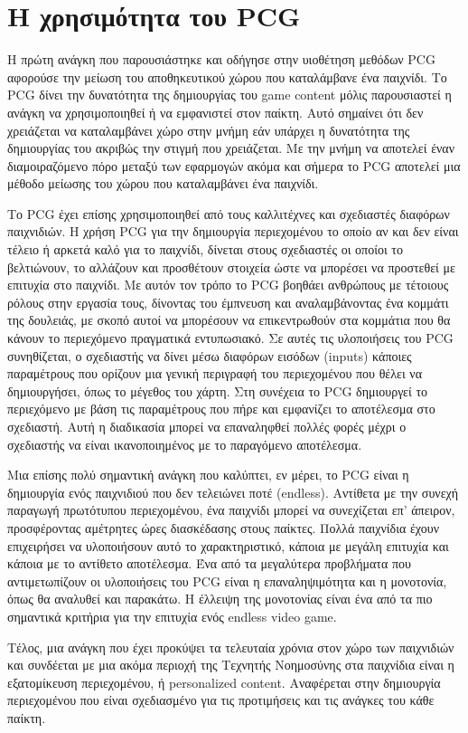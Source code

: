 \section{Η χρησιμότητα του PCG}
	Η πρώτη ανάγκη που παρουσιάστηκε και οδήγησε στην υιοθέτηση μεθόδων PCG αφορούσε την μείωση του αποθηκευτικού χώρου που καταλάμβανε ένα παιχνίδι. Το PCG δίνει την δυνατότητα της δημιουργίας του game content μόλις παρουσιαστεί η ανάγκη να χρησιμοποιηθεί ή να εμφανιστεί στον παίκτη. Αυτό σημαίνει ότι δεν χρειάζεται να καταλαμβάνει χώρο στην μνήμη εάν υπάρχει η δυνατότητα της δημιουργίας του ακριβώς την στιγμή που χρειάζεται. Με την μνήμη να αποτελεί έναν διαμοιραζόμενο πόρο μεταξύ των εφαρμογών ακόμα και σήμερα το PCG αποτελεί μια μέθοδο μείωσης του χώρου που καταλαμβάνει ένα παιχνίδι.
\par
	Το PCG έχει επίσης χρησιμοποιηθεί από τους καλλιτέχνες και σχεδιαστές διαφόρων παιχνιδιών. Η χρήση PCG για την δημιουργία περιεχομένου το οποίο αν και δεν είναι τέλειο ή αρκετά καλό για το παιχνίδι, δίνεται στους σχεδιαστές οι οποίοι το βελτιώνουν, το αλλάζουν και προσθέτουν στοιχεία ώστε να μπορέσει να προστεθεί με επιτυχία στο παιχνίδι. Με αυτόν τον τρόπο το PCG βοηθάει ανθρώπους με τέτοιους ρόλους στην εργασία τους, δίνοντας του έμπνευση και αναλαμβάνοντας ένα κομμάτι της δουλειάς, με σκοπό αυτοί να μπορέσουν να επικεντρωθούν στα κομμάτια που θα κάνουν το περιεχόμενο πραγματικά εντυπωσιακό. Σε αυτές τις υλοποιήσεις του PCG συνηθίζεται, ο σχεδιαστής να δίνει μέσω διαφόρων εισόδων (inputs) κάποιες παραμέτρους που ορίζουν μια γενική περιγραφή του περιεχομένου που θέλει να δημιουργήσει, όπως το μέγεθος του χάρτη. Στη συνέχεια το PCG δημιουργεί το περιεχόμενο με βάση τις παραμέτρους που πήρε και εμφανίζει το αποτέλεσμα στο σχεδιαστή. Αυτή η διαδικασία μπορεί να επαναληφθεί πολλές φορές μέχρι ο σχεδιαστής να είναι ικανοποιημένος με το παραγόμενο αποτέλεσμα.  \cite{pcgieee}
\par
	Μια επίσης πολύ σημαντική ανάγκη που καλύπτει, εν μέρει, το PCG είναι η δημιουργία ενός παιχνιδιού που δεν τελειώνει ποτέ (endless). Αντίθετα με την συνεχή παραγωγή πρωτότυπου περιεχομένου, ένα παιχνίδι μπορεί να συνεχίζεται επ’ άπειρον, προσφέροντας αμέτρητες ώρες διασκέδασης στους παίκτες. Πολλά παιχνίδια έχουν επιχειρήσει να υλοποιήσουν αυτό το χαρακτηριστικό, κάποια με μεγάλη επιτυχία και κάποια με το αντίθετο αποτέλεσμα. Ένα από τα μεγαλύτερα προβλήματα που αντιμετωπίζουν οι υλοποιήσεις του PCG είναι η επαναληψιμότητα και η μονοτονία, όπως θα αναλυθεί και παρακάτω. Η έλλειψη της μονοτονίας είναι ένα από τα πιο σημαντικά κριτήρια για την επιτυχία ενός endless video game.
\par
	Τέλος, μια ανάγκη που έχει προκύψει τα τελευταία χρόνια στον χώρο των παιχνιδιών και συνδέεται με μια ακόμα περιοχή της Τεχνητής Νοημοσύνης στα παιχνίδια είναι η εξατομίκευση περιεχομένου, ή personalized content. Αναφέρεται στην δημιουργία περιεχομένου που είναι σχεδιασμένο για τις προτιμήσεις και τις ανάγκες του κάθε παίκτη.

